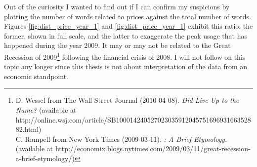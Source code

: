     Out of the curiosity I wanted to find out if I can confirm my suspicions by plotting the number of words related to prices against the total number of words. Figures \ref{fig:dist_price_year_1} and \ref{fig:dist_price_year_1} exhibit this ratio: the former, shown in full scale, and the latter  to exaggerate the peak usage that has happened during the year 2009. It may or may not be related to the Great Recession of 2009\footnote{D. Wessel from The Wall Street Journal (2010-04-08). \emph{Did  Live Up to the Name?} (available at http://online.wsj.com/article/SB10001424052702303591204575169693166352882.html) \\ C. Rampell from New York Times (2009-03-11). \emph{: A Brief Etymology.} (available at http://economix.blogs.nytimes.com/2009/03/11/great-recession-a-brief-etymology/)} following the financial crisis of 2008. I will not follow on this topic any longer since this thesis is not about interpretation of the data from an economic standpoint.
